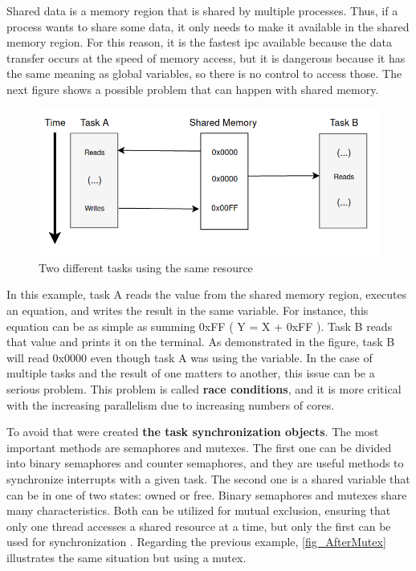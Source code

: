 Shared data is a memory region that is shared by multiple processes. Thus, if a process wants to share some data, it only needs to make it 
available in the shared memory region. For this reason, it is the fastest \gls{ipc} available because the data transfer occurs at the speed of 
memory access, but it is dangerous because it has the same meaning as global variables, so there is no control to access those. The next figure 
shows a possible problem that can happen with shared memory.

\begin{figure}[H]
	\centering
 	\includegraphics[width=0.7\linewidth]{Images/BeforeMutex.png}
 	\caption{ Two different tasks using the same resource }
	 \label{fig_BeforeMutex}
\end{figure}

In this example, task A reads the value from the shared memory region, executes an equation, and writes the result in the same variable. For 
instance, this equation can be as simple as summing 0xFF ( Y = X + 0xFF ). Task B reads that value and prints it on the terminal. As demonstrated 
in the figure, task B will read 0x0000 even though task A was using the variable. In the case of multiple tasks and the result of one matters to 
another, this issue can be a serious problem. This problem is called \textbf{race conditions}, and it is more critical with the increasing 
parallelism due to increasing numbers of cores.

To avoid that were created \textbf{the task synchronization objects}. The most important methods are semaphores and mutexes. The first one can be 
divided into binary semaphores and counter semaphores, and they are useful methods to synchronize interrupts with a given task. The second one is 
a shared variable that can be in one of two states: owned or free. Binary semaphores and mutexes share many characteristics. Both can be utilized 
for mutual exclusion, ensuring that only one thread accesses a shared resource at a time, but only the first can be used for synchronization 
\cite{OSbook2}. Regarding the previous example, \autoref{fig_AfterMutex} illustrates the same situation but using a mutex.

